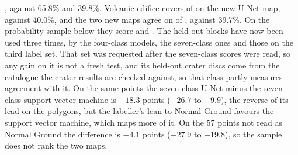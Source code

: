 , against 65.8\% and 39.8\%. Volcanic edifice covers
 of \pmsixty{} on the new U-Net map, against 40.0\%, and the two new maps agree on
 of \pmsixty, against 39.7\%. On the probability sample below they score
 and . %
The held-out blocks have now been used three times, by the four-class models, the seven-class ones and those on the
third label set. That set was requested after the seven-class scores were read, so any gain on it is not a fresh test,
and its held-out crater discs come from the catalogue the crater results are checked against, so that class partly
measures agreement with it. %
On the same points the seven-class U-Net minus the seven-class support vector machine is $-18.3$ points ($-26.7$ to
$-9.9$), the reverse of its lead on the polygons, but the labeller's lean to Normal Ground favours the support vector
machine, which maps more of it. On the 57 points not read as Normal Ground the difference is $-4.1$ points ($-27.9$ to
$+19.8$), so the sample does not rank the two maps. %

